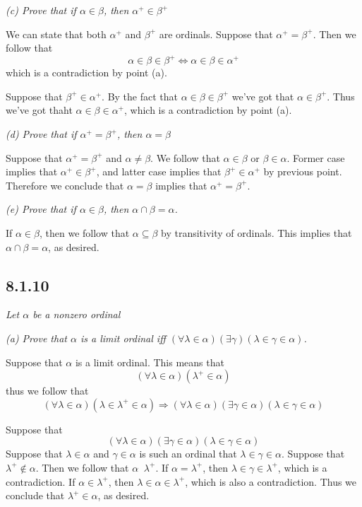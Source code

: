 \documentclass[11pt,oneside,titlepage]{book}
\DeclareMathOperator \lra {\Leftrightarrow}
\DeclareMathOperator \ra {\Rightarrow}
\DeclareMathOperator \ineq {\underline{\in}}
\begin{document}
\textit{(c) Prove that if $\alpha \in \beta$, then $\alpha^+ \in \beta^+$}

We can state that both $\alpha^+$ and $\beta^+$ are ordinals.
Suppose that $\alpha^+ = \beta^+$. Then we follow that
$$\alpha \in \beta \in \beta^+ \lra \alpha \in \beta \in \alpha^+ $$
which is a contradiction by point (a).

Suppose that $\beta^+ \in \alpha^+$. By the fact that $\alpha \in \beta \in \beta^+$ we've got
that $\alpha \in \beta^+$. Thus we've got thaht $\alpha \in \beta \in \alpha^+$, which is
a contradiction by point (a).

\textit{(d) Prove that if $\alpha^+ = \beta^+$, then $\alpha = \beta$}

Suppose that $\alpha^+ = \beta^+$ and $\alpha \neq \beta$. We follow that
$\alpha \in \beta$ or $\beta \in \alpha$. Former case implies that $\alpha^+ \in \beta^+$,
and latter case implies that $\beta^+ \in \alpha^+$ by previous point. Therefore
we conclude that $\alpha = \beta$ implies that $\alpha^+ = \beta^+$.

\textit{(e) Prove that if $\alpha \in \beta$, then $\alpha \cap \beta = \alpha$.}

If $\alpha  \in \beta$, then we follow that $\alpha \subseteq \beta$ by transitivity of
ordinals. This implies that $\alpha \cap \beta = \alpha$, as desired.

\subsection*{8.1.10}

\textit{Let $\alpha$ be a nonzero ordinal}

\textit{(a) Prove that $\alpha$ is a limit ordinal iff
  $(\forall \lambda \in \alpha)(\exists \gamma)(\lambda \in \gamma \in \alpha)$.}

Suppose that $\alpha$ is a limit ordinal. This means that
$$(\forall \lambda \in \alpha) (\lambda^+ \in \alpha)$$
thus we follow that
$$(\forall \lambda \in \alpha) (\lambda \in \lambda^+ \in \alpha) \ra
(\forall \lambda \in \alpha)(\exists \gamma \in \alpha)(\lambda \in \gamma \in \alpha)$$

Suppose that
$$(\forall \lambda \in \alpha)(\exists \gamma \in \alpha)(\lambda \in \gamma \in \alpha)$$
Suppose that $\lambda \in \alpha$ and $\gamma \in \alpha$ is such an ordinal
that $\lambda \in \gamma \in \alpha$. Suppose that $\lambda^+ \notin \alpha$.
Then we follow that $\alpha \ineq \lambda^+$. If $\alpha = \lambda^+$, then
$\lambda \in \gamma \in \lambda^+$, which is a contradiction.
If $\alpha \in \lambda^+$, then $\lambda \in \alpha \in \lambda^+$, which is also
a contradiction. Thus we conclude that $\lambda^+ \in \alpha$, as desired.
\end{document}
